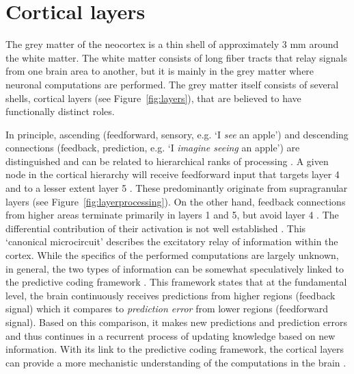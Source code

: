\section*{Cortical layers}
The grey matter of the neocortex is a thin shell of approximately 3 mm \cite{Zilles1990} around the white matter. The white matter consists of long fiber tracts that relay signals from one brain area to another, but it is mainly in the grey matter where neuronal computations are performed. The grey matter itself consists of several shells, cortical layers (see Figure~\ref{fig:layers}), that are believed to have functionally distinct roles.

In principle, ascending (feedforward, sensory, e.g. `I \emph{see} an apple') and descending connections (feedback, prediction, e.g. `I \emph{imagine seeing} an apple') are distinguished \cite{Rockland1979} and can be related to hierarchical ranks of processing \cite{Barone2000}. A given node in the cortical hierarchy will receive feedforward input that targets layer 4 and to a lesser extent layer 5 \cite{Constantinople2013}. These predominantly originate from supragranular layers (see Figure~\ref{fig:layerprocessing}). On the other hand, feedback connections from higher areas terminate primarily in layers 1 and 5, but avoid layer 4 \cite{Anderson2009}. The differential contribution of their activation is not well established \cite{Shipp2013}. This `canonical microcircuit' describes the excitatory relay of information within the cortex. While the specifics of the performed computations are largely unknown, in general, the two types of information can be somewhat speculatively linked to the predictive coding framework \cite{Friston2010}. This framework states that at the fundamental level, the brain continuously receives predictions from higher regions (feedback signal) which it compares to \emph{prediction error} from lower regions (feedforward signal). Based on this comparison, it makes new predictions and prediction errors and thus continues in a recurrent process of updating knowledge based on new information. With its link to the predictive coding framework, the cortical layers can provide a more mechanistic understanding of the computations in the brain \cite{Shipp2016}.


